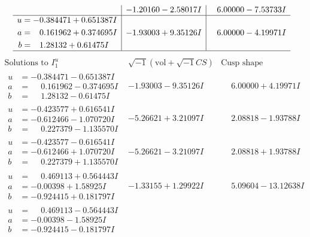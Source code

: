 \documentclass[1p]{elsarticle_modified}
\theoremstyle{definition}
\newcommand{\I}{\sqrt{-1}}
\begin{document}
$$\begin{array}{c|c|c}
 & -1.20160 - 2.58017 I & \phantom{-}6.00000 - 7.53733 I \\ \hline\begin{aligned}
u &= -0.384471 + 0.651387 I \\
a &= \phantom{-}0.161962 + 0.374695 I \\
b &= \phantom{-}1.28132 + 0.61475 I\end{aligned}
 & -1.93003 + 9.35126 I & \phantom{-}6.00000 - 4.19971 I\\
 \hline 
 \end{array}$$\newpage$$\begin{array}{c|c|c}  
\text{Solutions to }I^u_{1}& \I (\text{vol} + \sqrt{-1}CS) & \text{Cusp shape}\\
 \hline 
\begin{aligned}
u &= -0.384471 - 0.651387 I \\
a &= \phantom{-}0.161962 - 0.374695 I \\
b &= \phantom{-}1.28132 - 0.61475 I\end{aligned}
 & -1.93003 - 9.35126 I & \phantom{-}6.00000 + 4.19971 I \\ \hline\begin{aligned}
u &= -0.423577 + 0.616541 I \\
a &= -0.612466 - 1.070720 I \\
b &= \phantom{-}0.227379 - 1.135570 I\end{aligned}
 & -5.26621 + 3.21097 I & \phantom{-}2.08818 - 1.93788 I \\ \hline\begin{aligned}
u &= -0.423577 - 0.616541 I \\
a &= -0.612466 + 1.070720 I \\
b &= \phantom{-}0.227379 + 1.135570 I\end{aligned}
 & -5.26621 - 3.21097 I & \phantom{-}2.08818 + 1.93788 I \\ \hline\begin{aligned}
u &= \phantom{-}0.469113 + 0.564443 I \\
a &= -0.00398 + 1.58925 I \\
b &= -0.924415 + 0.181797 I\end{aligned}
 & -1.33155 + 1.29922 I & \phantom{-}5.09604 - 13.12638 I \\ \hline\begin{aligned}
u &= \phantom{-}0.469113 - 0.564443 I \\
a &= -0.00398 - 1.58925 I \\
b &= -0.924415 - 0.181797 I\end{aligned}

\end{array}$$
\end{document}
